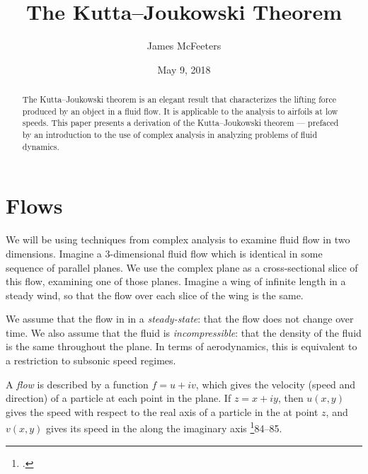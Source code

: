 \documentclass[letterpaper, twoside, 12 pt]{article}
\title{The Kutta--Joukowski Theorem}
\date{May 9, 2018}
\author{James McFeeters}
\begin{document}
	\maketitle

\begin{abstract}
	The Kutta--Joukowski theorem is an elegant result that characterizes the lifting force produced by an object in a fluid flow. 
	It is applicable to the analysis to airfoils at low speeds.
	This paper presents a derivation of the Kutta--Joukowski theorem --- prefaced by an introduction to the use of complex analysis in analyzing problems of fluid dynamics.
\end{abstract}

\setlength{\parindent}{0 pt}
\setlength{\parskip}{1 em}

\section{Flows} %
\label{sec:flows}
	We will be using techniques from complex analysis to examine fluid flow in two dimensions.
	Imagine a 3-dimensional fluid flow which is identical in some sequence of parallel planes.
	We use the complex plane as a cross-sectional slice of this flow, examining one of those planes.
	Imagine a wing of infinite length in a steady wind, so that the flow over each slice of the wing is the same.

	We assume that the flow in in a \textit{steady-state}: that the flow does not change over time.
	We also assume that the fluid is \textit{incompressible}: that the density of the fluid is the same throughout the plane.
	In terms of aerodynamics, this is equivalent to a restriction to subsonic speed regimes.

	\begin{definition}[Flow]
		A \textit{flow} is described by a function $f = u + iv$, which gives the velocity (speed and direction) of a particle at each point in the plane.
		If $z = x + iy$, then $u(x, y)$ gives the speed with respect to the real axis of a particle in the at point $z$, and $v(x, y)$ gives its speed in the along the imaginary axis \footcite{fisher}{84--85}.
	\end{definition}
\end{document}
